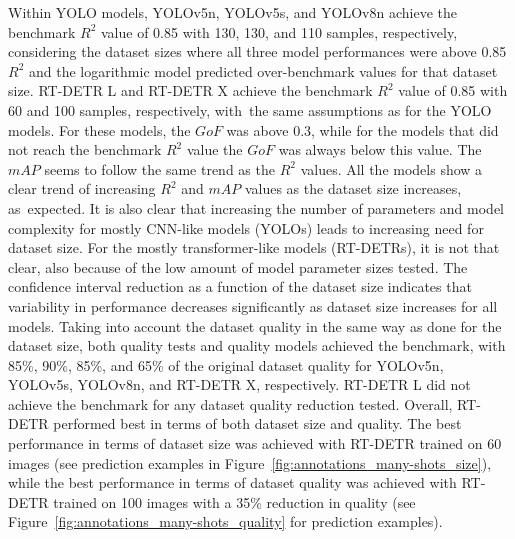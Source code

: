 \documentclass[12pt,a4paper,oneside]{report}
\begin{document}
Within YOLO models, YOLOv5n, YOLOv5s, and YOLOv8n achieve the benchmark $R^2$ 
value of 0.85 with 130, 130, and 110 samples, respectively, considering the dataset
sizes where all three model performances were above 0.85 $R^2$ and the logarithmic
model predicted over-benchmark values for that dataset size.
RT-DETR L and RT-DETR X achieve the benchmark $R^2$ value of 0.85 with 60 and 100 samples,
respectively, with~the same assumptions as for the YOLO models.
For these models, the $GoF$ was above 0.3, while for the models that did
not reach the benchmark $R^2$ value the $GoF$ was always below this value.
The $mAP$ seems to follow the same trend as the $R^2$ values.
All the models show a clear trend of increasing $R^2$ and $mAP$
values as the dataset size increases, as~expected.
It is also clear that increasing the number of parameters and model complexity for
mostly CNN-like models (YOLOs) leads to increasing need for dataset size.
For the mostly transformer-like models (RT-DETRs), it is not that clear, also because of
the low amount of model parameter sizes tested.
The confidence interval reduction as a function of the dataset size indicates that 
variability in performance decreases significantly as dataset size increases for 
all models.
Taking into account the dataset quality in the same way as done for the dataset size,
both quality tests and quality models achieved the benchmark, with 85\%, 90\%, 85\%, and
65\% of the original dataset quality for YOLOv5n, YOLOv5s, YOLOv8n, and RT-DETR X, respectively.
RT-DETR L did not achieve the benchmark for any dataset quality reduction tested.
Overall, RT-DETR performed best in terms of both dataset size and quality. 
The best performance in terms of dataset size was achieved with RT-DETR trained 
on 60 images (see prediction examples in Figure~\ref{fig:annotations_many-shots_size}), while the best performance in 
terms of dataset quality 
was achieved with RT-DETR trained on 100 images with a 35\% reduction in quality
(see Figure~\ref{fig:annotations_many-shots_quality} for prediction examples).
\end{document}
